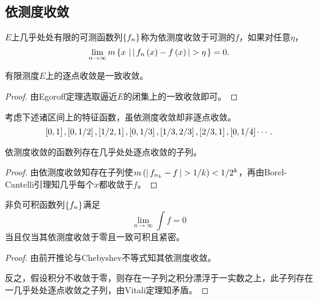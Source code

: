 \documentclass{ctexrep}
\begin{document}
  \subsection{依测度收敛}
  \begin{definition}
    $E$上几乎处处有限的可测函数列$\left\{f_n\right\}$称为依测度收敛于可测的$f$，如果对任意$\eta$，
    \[ \lim_{n\to\infty}m\setcond{x}{\abs{f_n\pare{x}-f\pare{x}}>\eta} = 0. \]
  \end{definition}
  \begin{proposition}
    有限测度$E$上的逐点收敛是一致收敛。
  \end{proposition}
  \begin{proof}
    由Egoroff定理选取逼近$E$的闭集上的一致收敛即可。
  \end{proof}
  \begin{ex}
    考虑下述诸区间上的特征函数，虽依测度收敛却非逐点收敛。
    \[ \left[0,1\right],\left[0,1/2\right],\left[1/2,1\right],\left[0,1/3\right],\left[1/3,2/3\right],\left[2/3,1\right],\left[0,1/4\right]\cdots. \]
  \end{ex}
  \begin{theorem}[Riesz]
    依测度收敛的函数列存在几乎处处逐点收敛的子列。
  \end{theorem}
  \begin{proof}
    由依测度收敛知存在子列使$m\pare{\abs{f_{n_k}-f}>1/k}<1/2^k$，再由Borel-Cantelli引理知几乎每个$x$都收敛于$f$。
  \end{proof}
  \begin{collary}
    \label{coll:mcon2int}
    非负可积函数列$\left\{f_n\right\}$满足
    \[ \lim_{n\to\infty} \int f = 0 \]
    当且仅当其依测度收敛于零且一致可积且紧密。
  \end{collary}
  \begin{proof}
    由前开推论与Chebyshev不等式知其依测度收敛。
    \par
    反之，假设积分不收敛于零，则存在一子列之积分漂浮于一实数之上，此子列存在一几乎处处逐点收敛之子列，由Vitali定理知矛盾。
  \end{proof}
\end{document}
